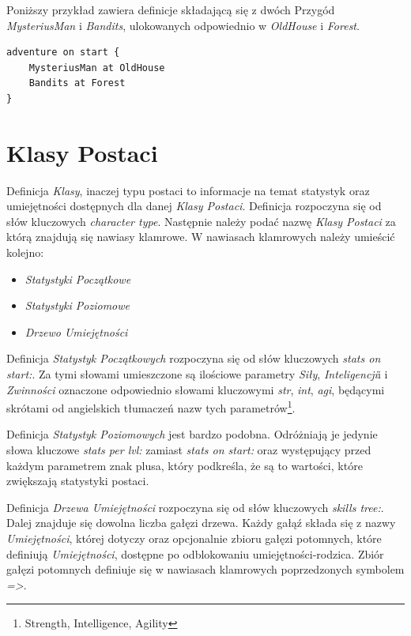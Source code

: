\documentclass[openright]{xmgr}
\begin{document}
Poniższy przykład zawiera definicje składającą się z dwóch Przygód \textit{MysteriusMan} i \textit{Bandits}, ulokowanych odpowiednio w \textit{OldHouse} i \textit{Forest}.

\begin{verbatim}
adventure on start {
    MysteriusMan at OldHouse
    Bandits at Forest
}
\end{verbatim}

\section{Klasy Postaci}
Definicja \textit{Klasy}, inaczej typu postaci to informacje na temat statystyk oraz umiejętności dostępnych dla danej \textit{Klasy Postaci}. Definicja rozpoczyna się od słów kluczowych \textit{character type}. Następnie należy podać nazwę \textit{Klasy Postaci} za którą znajdują się nawiasy klamrowe. W nawiasach klamrowych należy umieścić kolejno:
\begin{itemize}
	\item \textit{Statystyki Początkowe}
	\item \textit{Statystyki Poziomowe}
	\item \textit{Drzewo Umiejętności}
\end{itemize}

Definicja \textit{Statystyk Początkowych} rozpoczyna się od słów kluczowych \textit{stats on start:}. Za tymi słowami umieszczone są ilościowe parametry \textit{Siły}, \textit{Inteligencji}i i \textit{Zwinności} oznaczone odpowiednio słowami kluczowymi \textit{str}, \textit{int}, \textit{agi}, będącymi skrótami od angielskich tłumaczeń nazw tych parametrów\footnote{Strength, Intelligence, Agility}.

Definicja \textit{Statystyk Poziomowych} jest bardzo podobna. Odróżniają je jedynie słowa kluczowe \textit{stats per lvl:} zamiast  \textit{stats on start:} oraz występujący przed każdym parametrem znak plusa, który podkreśla, że są to wartości, które zwiększają statystyki postaci. 

Definicja \textit{Drzewa Umiejętności} rozpoczyna się od słów kluczowych \textit{skills tree:}. Dalej znajduje się dowolna liczba gałęzi drzewa.
Każdy gałąź składa się z nazwy \textit{Umiejętności}, której dotyczy oraz opcjonalnie zbioru gałęzi potomnych, które definiują \textit{Umiejętności}, dostępne po odblokowaniu umiejętności-rodzica.
Zbiór gałęzi potomnych definiuje się w nawiasach klamrowych poprzedzonych symbolem \textit{=>}. 
\end{document}
